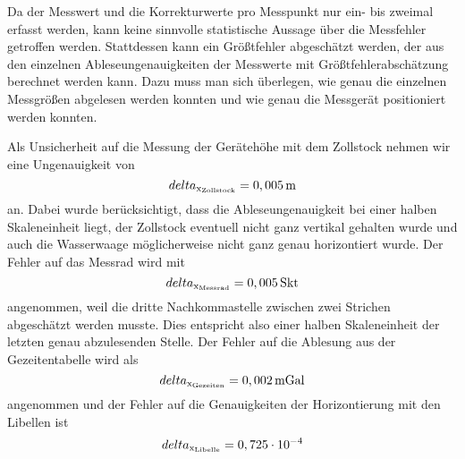 Da der Messwert und die Korrekturwerte pro Messpunkt nur ein- bis zweimal erfasst werden, kann keine sinnvolle statistische Aussage über die Messfehler getroffen werden. Stattdessen kann ein Größtfehler abgeschätzt werden, der aus den einzelnen Ableseungenauigkeiten der Messwerte mit Größtfehlerabschätzung berechnet werden kann. Dazu muss man sich überlegen, wie genau die einzelnen Messgrößen abgelesen werden konnten und wie genau die Messgerät positioniert werden konnten.

Als Unsicherheit auf die Messung der Gerätehöhe mit dem Zollstock nehmen wir eine Ungenauigkeit von
\begin{equation}
 delta_{\mathrm{x_{\mathrm{Zollstock}}}}=0,005\,\mathrm{m}
\end{equation}
an. Dabei wurde berücksichtigt, dass die Ableseungenauigkeit bei einer halben Skaleneinheit liegt, der Zollstock eventuell nicht ganz vertikal gehalten wurde und auch die Wasserwaage möglicherweise nicht ganz genau horizontiert wurde. Der Fehler auf das Messrad wird mit
\begin{equation}
 delta_{\mathrm{x_{\mathrm{Messrad}}}}=0,005\,\mathrm{Skt}
\end{equation}
angenommen, weil die dritte Nachkommastelle zwischen zwei Strichen abgeschätzt werden musste. Dies entspricht also einer halben Skaleneinheit der letzten genau abzulesenden Stelle. Der Fehler auf die Ablesung aus der Gezeitentabelle wird als
\begin{equation}
 delta_{\mathrm{x_{\mathrm{Gezeiten}}}}=0,002\,\mathrm{mGal}
\end{equation}
angenommen und der Fehler auf die Genauigkeiten der Horizontierung  mit den Libellen ist
\begin{equation}
 delta_{\mathrm{x_{\mathrm{Libelle}}}}=0,725\cdot 10^{-4}
\end{equation}
